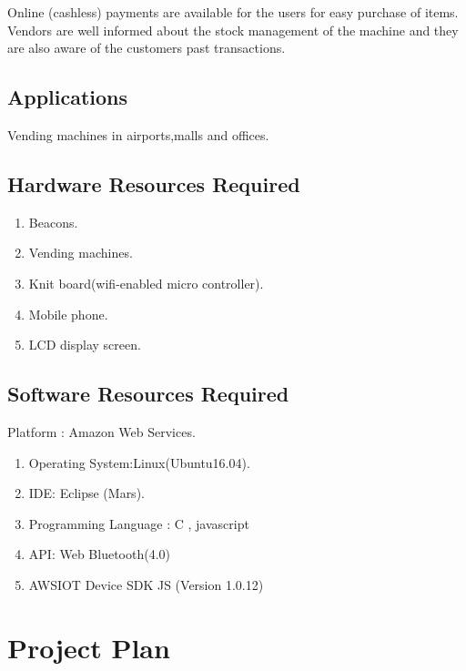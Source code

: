 \documentclass[oneside,a4paper,12pt]{report}
\begin{document}
 Online (cashless) payments are available for the users for easy purchase of items.
Vendors are well informed about the stock management of the machine and they are also aware of the customers past transactions.

\section{Applications}

Vending machines in airports,malls and offices.

\section{Hardware Resources Required}
\begin{enumerate}
\item Beacons.
\item Vending machines.
\item Knit board(wifi-enabled micro controller).
\item Mobile phone.
\item LCD display screen.
\end{enumerate}


\section{Software Resources Required}
Platform : Amazon Web Services.
\begin{enumerate}
\item Operating System:Linux(Ubuntu16.04). 
\item IDE: Eclipse (Mars).
\item Programming Language : C , javascript
\item API: Web Bluetooth(4.0)
\item AWSIOT Device SDK JS (Version 1.0.12)
\end{enumerate}




\chapter{Project Plan}
\end{document}
